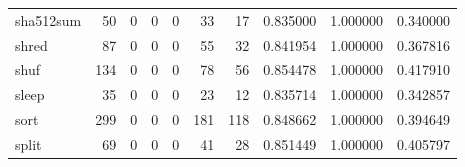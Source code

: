 \begin{longtable}{lrrrrrrrrr}
sha512sum &                                        50 &                                                  0 &                                                  0 &                                                  0 &                                                 33 &                                                 17 &                                           0.835000 &                               1.000000 &                             0.340000 \\
shred     &                                        87 &                                                  0 &                                                  0 &                                                  0 &                                                 55 &                                                 32 &                                           0.841954 &                               1.000000 &                             0.367816 \\
shuf      &                                       134 &                                                  0 &                                                  0 &                                                  0 &                                                 78 &                                                 56 &                                           0.854478 &                               1.000000 &                             0.417910 \\
sleep     &                                        35 &                                                  0 &                                                  0 &                                                  0 &                                                 23 &                                                 12 &                                           0.835714 &                               1.000000 &                             0.342857 \\
sort      &                                       299 &                                                  0 &                                                  0 &                                                  0 &                                                181 &                                                118 &                                           0.848662 &                               1.000000 &                             0.394649 \\
split     &                                        69 &                                                  0 &                                                  0 &                                                  0 &                                                 41 &                                                 28 &                                           0.851449 &                               1.000000 &                             0.405797 \\

\end{longtable}
